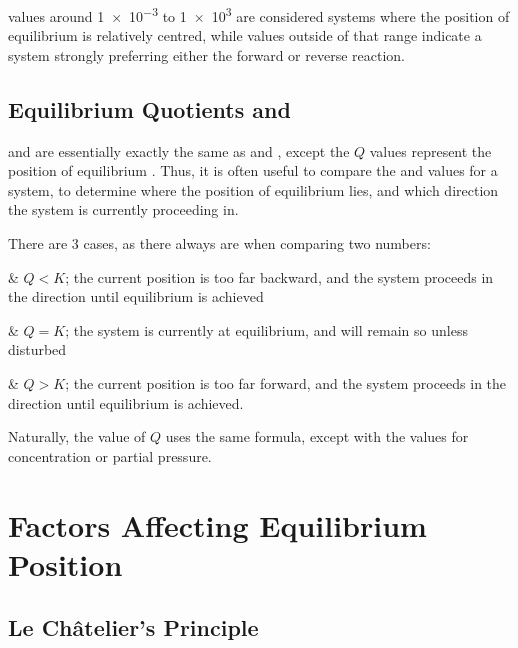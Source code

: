 			\Kc{} values around \num{1e-3} to \num{1e3} are considered systems where the position of equilibrium is relatively centred,
			while values outside of that range indicate a system strongly preferring either the forward or reverse reaction.



		\subsection{Equilibrium Quotients \texorpdfstring{\Qc}{Qc} and \texorpdfstring{\Qp}{Qp}}

			\Qc{} and \Qp{} are essentially exactly the same as \Kc{} and \Kp{}, except the $Q$ values represent the position of equilibrium
			. Thus, it is often useful to compare the \Qc{} and \Kc{} values for a system, to determine
			where the  position of equilibrium lies, and which direction the system is currently proceeding in.

			There are 3 cases, as there always are when comparing two numbers:

			\begin{bulletlist}
				& $Q < K$; the current position is too far backward, and the system proceeds in the  direction until equilibrium
				is achieved

				& $Q = K$; the system is currently at equilibrium, and will remain so unless disturbed

				& $Q > K$; the current position is too far forward, and the system proceeds in the  direction until equilibrium
				is achieved.
			\end{bulletlist}

			Naturally, the value of $Q$ uses the same formula, except with the  values for concentration or partial
			pressure.





	\pagebreak
	\section{Factors Affecting Equilibrium Position}

		\subsection{Le Châtelier's Principle}

